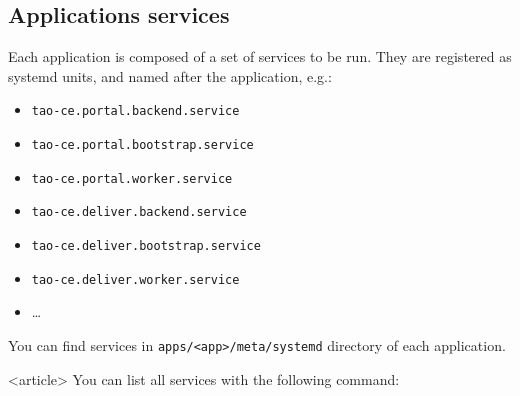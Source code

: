 \subsection{Applications services}
\begin{frame}[fragile=singleslide]
    Each application is composed of a set of services to be run. They are registered as \alert{systemd units}, and named after the application, e.g.:
    \begin{itemize}
        \item \texttt{tao-ce.portal.backend.service}
        \item \texttt{tao-ce.portal.bootstrap.service}
        \item \texttt{tao-ce.portal.worker.service}
        \item \texttt{tao-ce.deliver.backend.service}
        \item \texttt{tao-ce.deliver.bootstrap.service}
        \item \texttt{tao-ce.deliver.worker.service}
        \item \dots
    \end{itemize}

    You can find services in \taocerepo \texttt{apps/<app>/meta/systemd} directory of each application.

\begin{onlyenv}<article>
You can list all services with the following command: 
\end{onlyenv}
\end{frame}


